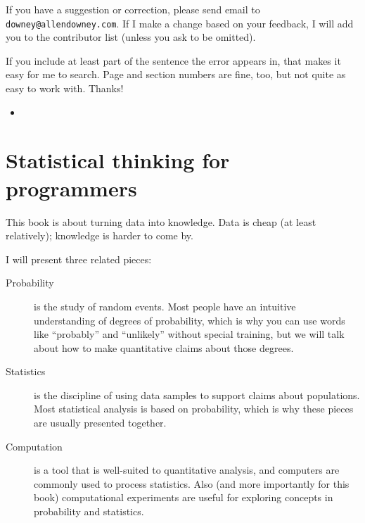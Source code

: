 \documentclass[12pt]{book}
\begin{document}

If you have a suggestion or correction, please send email to 
{\tt downey@allendowney.com}.  If I make a change based on your
feedback, I will add you to the contributor list
(unless you ask to be omitted).

If you include at least part of the sentence the
error appears in, that makes it easy for me to search.  Page and
section numbers are fine, too, but not quite as easy to work with.
Thanks!

\small

\begin{itemize}

\item 


\end{itemize}

\normalsize

\clearemptydoublepage

\begin{latexonly}

\tableofcontents

\clearemptydoublepage

\end{latexonly}

\mainmatter


\chapter{Statistical thinking for programmers}
\label{intro}

This book is about turning data into knowledge.  Data is cheap (at
least relatively); knowledge is harder to come by.

I will present three related pieces:

\begin{description}

\item[Probability] is the study of random events.  Most people have an
  intuitive understanding of degrees of probability, which is why you
  can use words like ``probably'' and ``unlikely'' without special
  training, but we will talk about how to make quantitative claims
  about those degrees.

\item[Statistics] is the discipline of using data samples to support
  claims about populations.  Most statistical analysis is based on
  probability, which is why these pieces are usually presented
  together.

\item[Computation] is a tool that is well-suited to quantitative
  analysis, and computers are commonly used to process statistics.
  Also (and more importantly for this book) computational experiments
  are useful for exploring concepts in probability and statistics.

\end{description}
\end{document}
